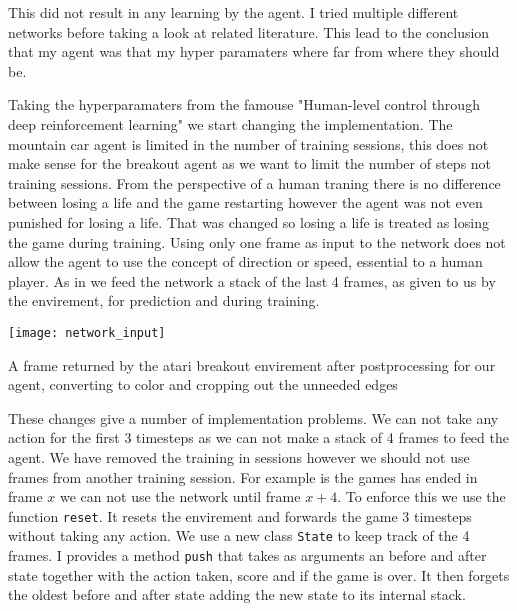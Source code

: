 This did not result in any learning by the agent. I tried multiple different networks before taking a look at related literature\cite{atari}. This lead to the conclusion that my agent was that my hyper paramaters where far from where they should be.

Taking the hyperparamaters from the famouse "Human-level control through deep reinforcement learning"\cite{DQN} we start changing the implementation. The mountain car agent is limited in the number of training sessions, this does not make sense for the breakout agent as we want to limit the number of steps not training sessions. From the perspective of a human traning there is no difference between losing a life and the game restarting however the agent was not even punished for losing a life. That was changed so losing a life is treated as losing the game during training.
Using only one frame as input to the network does not allow the agent to use the concept of direction or speed, essential to a human player. As in\cite{DQN} we feed the network a stack of the last 4 frames, as given to us by the envirement, for prediction and during training. 

\begin{marginfigure}
    \texttt{[image: network\_input]}
    \caption{A frame returned by the atari breakout envirement after postprocessing for our agent, converting to color and cropping out the unneeded edges}
    \label{fig:breakout_postprocess}
\end{marginfigure}

These changes give a number of implementation problems. We can not take any action for the first 3 timesteps as we can not make a stack of 4 frames to feed the agent. We have removed the training in sessions however we should not use frames from another training session. For example is the games has ended in frame $x$ we can not use the network until frame $x+4$. To enforce this we use the function \texttt{reset}. It resets the envirement and forwards the game 3 timesteps without taking any action. We use a new class \texttt{State} to keep track of the 4 frames. I provides a method \texttt{push} that takes as arguments an before and after state together with the action taken, score and if the game is over. It then forgets the oldest before and after state adding the new state to its internal stack.